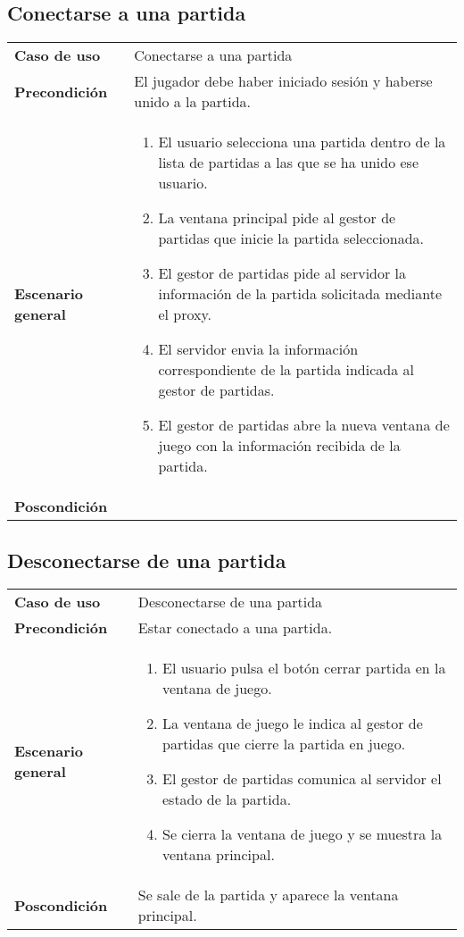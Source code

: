 \subsection{Conectarse a una partida}
{\footnotesize
\begin{tabularx}{0.95\textwidth}{p{}|X}

\textbf{Caso de uso} & Conectarse a una partida \\

\textbf{Precondición} & El jugador debe haber iniciado sesión y haberse unido a
la partida.\\

\textbf{Escenario general} & \begin{enumerate}
\item El usuario selecciona una partida dentro de la lista de partidas a las que
se ha unido ese usuario.
\item La ventana principal pide al gestor de partidas que inicie la partida
seleccionada.
\item El gestor de partidas pide al servidor la información de la partida
solicitada mediante el proxy.
\item El servidor envia la información correspondiente de la partida indicada al
gestor de partidas.
\item El gestor de partidas abre la nueva ventana de juego con la información 
recibida de la partida.

\end{enumerate} \\

\textbf{Poscondición} 

\end{tabularx}
}

\subsection{Desconectarse de una partida}
{\footnotesize
\begin{tabularx}{0.95\textwidth}{p{}|X}

\textbf{Caso de uso} & Desconectarse de una partida \\

\textbf{Precondición} &  Estar conectado a una partida.\\

\textbf{Escenario general} & \begin{enumerate}
\item El usuario pulsa el botón cerrar partida en la ventana de juego.
\item La ventana de juego le indica al gestor de partidas que cierre la partida
en juego.
\item El gestor de partidas comunica al servidor el estado de la partida.
\item Se cierra la ventana de juego y se muestra la ventana principal.

\end{enumerate} \\

\textbf{Poscondición} & Se sale de la partida y aparece la ventana principal.

\end{tabularx}
}

